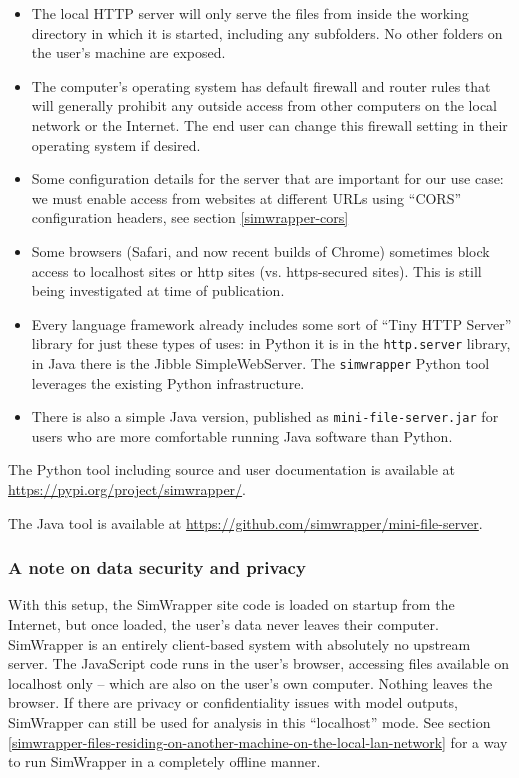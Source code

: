 \begin{itemize}
\item
  The local HTTP server will only serve the files from inside the
  working directory in which it is started, including any subfolders. No
  other folders on the user's machine are exposed.
\item
  The computer's operating system has default firewall and router rules
  that will generally prohibit any outside access from other computers
  on the local network or the Internet. The end user can change this firewall
  setting in their operating system if desired.
\item
  Some configuration details for the server that are important for our
  use case: we must enable access from websites at different URLs using
  ``\gls{CORS}'' configuration headers, see section \ref{simwrapper-cors}
\item
  Some browsers (Safari, and now recent builds of Chrome) sometimes
  block access to localhost sites or http sites (vs. https-secured sites).
  This is still being investigated at time of publication.
\item
  Every language framework already includes some sort of ``Tiny HTTP
  Server'' library for just these types of uses: in Python it is in the
  \texttt{http.server} library, in Java there is the Jibble
  SimpleWebServer. The \texttt{simwrapper} Python tool leverages the
  existing Python infrastructure.
\item
  There is also a simple Java version, published as
  \texttt{mini-file-server.jar} for users who are more comfortable
  running Java software than Python.
\end{itemize}

The Python tool including source and user documentation is available at \url{https://pypi.org/project/simwrapper/}.

The Java tool is available at \url{https://github.com/simwrapper/mini-file-server}.


\hypertarget{simwrapper-data-security-and-privacy}{%
\subsubsection{A note on data security and privacy}\label{simwrapper-data-security-and-privacy}}

With this setup, the SimWrapper site code is loaded on startup from the Internet, but once loaded, the user's data never leaves their computer. SimWrapper is an entirely client-based system with absolutely no upstream server. The JavaScript code runs in the user's browser, accessing files available on localhost only -- which are also on the user's own computer. Nothing leaves the browser. If there are privacy or confidentiality issues with model outputs, SimWrapper can still be used for analysis in this ``localhost'' mode. See section \ref{simwrapper-files-residing-on-another-machine-on-the-local-lan-network} for a way to run SimWrapper in a completely offline manner.

